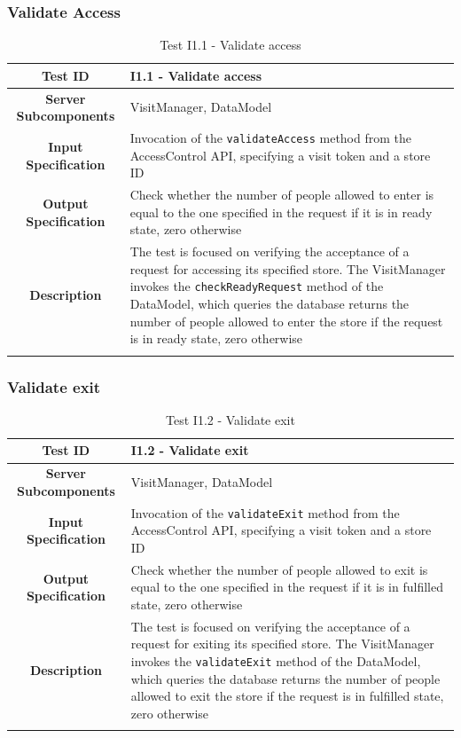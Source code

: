 \documentclass[a4paper,oneside,11pt]{book}
\begin{document}
    \subsubsection{Validate Access}
    \begin{longtable}[c]{|>{\bfseries{}}c|H{.5\textwidth}|}
        \hline
        Test ID & I1.1 - Validate access \\ \hline
        Server Subcomponents & VisitManager, DataModel \\ \hline
        Input Specification & Invocation of the \texttt{validateAccess} method from the AccessControl API, specifying a visit token and a store ID \\ \hline
        Output Specification & Check whether the number of people allowed to enter is equal to the one specified in the request if it is in ready state, zero otherwise \\ \hline
        Description & The test is focused on verifying the acceptance of a request for accessing its specified store. The VisitManager invokes the \texttt{checkReadyRequest} method of the DataModel, which queries the database returns the number of people allowed to enter the store if the request is in ready state, zero otherwise \\ \hline
        \caption{Test I1.1 - Validate access}
        \label{table:test_I1.1}
    \end{longtable}
    
    \subsubsection{Validate exit}
    \begin{longtable}[c]{|>{\bfseries{}}c|H{.5\textwidth}|}
        \hline
        Test ID & I1.2 - Validate exit \\ \hline
        Server Subcomponents & VisitManager, DataModel \\ \hline
        Input Specification & Invocation of the \texttt{validateExit} method from the AccessControl API, specifying a visit token and a store ID \\ \hline
        Output Specification & Check whether the number of people allowed to exit is equal to the one specified in the request if it is in fulfilled state, zero otherwise \\ \hline
        Description & The test is focused on verifying the acceptance of a request for exiting its specified store. The VisitManager invokes the \texttt{validateExit} method of the DataModel, which queries the database returns the number of people allowed to exit the store if the request is in fulfilled state, zero otherwise \\ \hline
        \caption{Test I1.2 - Validate exit}
        \label{table:test_I1.2}
    \end{longtable}
    
\end{document}
